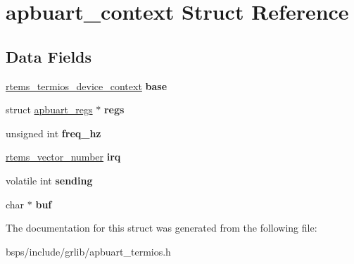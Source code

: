 \hypertarget{structapbuart__context}{}\section{apbuart\+\_\+context Struct Reference}
\label{structapbuart__context}
\subsection*{Data Fields}
\begin{DoxyCompactItemize}
\item 
\mbox{\label{structapbuart__context_acf480e3fe03fb419eec1c7ea3eea1d39}} 
\mbox{\hyperlink{structrtems__termios__device__context}{rtems\+\_\+termios\+\_\+device\+\_\+context}} {\bfseries base}
\item 
\mbox{\label{structapbuart__context_ac430b89e6d95da1fe86206f3f1c75514}} 
struct \mbox{\hyperlink{structapbuart__regs}{apbuart\+\_\+regs}} $\ast$ {\bfseries regs}
\item 
\mbox{\label{structapbuart__context_a16c9c4948231dc619363316ae368bec6}} 
unsigned int {\bfseries freq\+\_\+hz}
\item 
\mbox{\label{structapbuart__context_a8cfbd67b84dfd66d18583dde68bfe8c4}} 
\mbox{\hyperlink{group__ClassicINTR_ga3e434c197d99f128e78cae4d9358bd8b}{rtems\+\_\+vector\+\_\+number}} {\bfseries irq}
\item 
\mbox{\label{structapbuart__context_a07d7479f24b5eb15b6a323d32b98c3ab}} 
volatile int {\bfseries sending}
\item 
\mbox{\label{structapbuart__context_a534702e59d75ccb1fdf5a714c7ef598f}} 
char $\ast$ {\bfseries buf}
\end{DoxyCompactItemize}


The documentation for this struct was generated from the following file\+:\begin{DoxyCompactItemize}
\item 
bsps/include/grlib/apbuart\+\_\+termios.\+h\end{DoxyCompactItemize}
